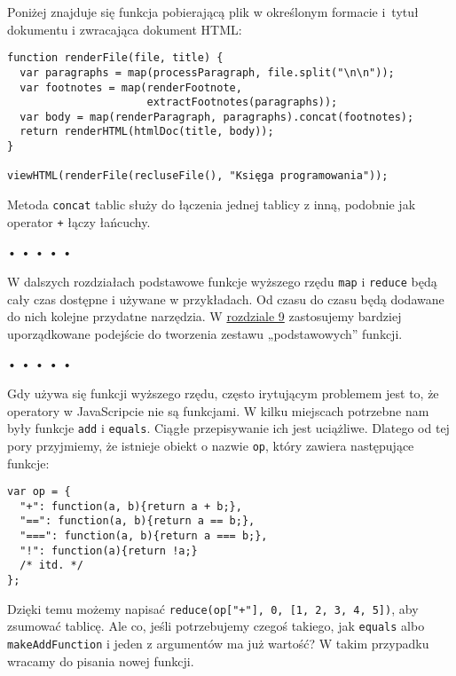Poniżej znajduje się funkcja pobierającą plik w określonym formacie i~tytuł dokumentu i zwracająca dokument HTML:

  
\begin{verbatim} 
function renderFile(file, title) {
  var paragraphs = map(processParagraph, file.split("\n\n"));
  var footnotes = map(renderFootnote,
                      extractFootnotes(paragraphs));
  var body = map(renderParagraph, paragraphs).concat(footnotes);
  return renderHTML(htmlDoc(title, body));
}

viewHTML(renderFile(recluseFile(), "Księga programowania"));
 \end{verbatim}
  
Metoda \texttt{concat} tablic służy do łączenia jednej tablicy z inną, podobnie jak operator \texttt{+} łączy łańcuchy.



\begin{center}
• • • • •
\end{center}

  
W dalszych rozdziałach podstawowe funkcje wyższego rzędu \texttt{map} i \texttt{reduce} będą cały czas dostępne i używane w przykładach. Od czasu do czasu będą dodawane do nich kolejne przydatne narzędzia. W \hyperref[chap:9]{rozdziale 9} zastosujemy bardziej uporządkowane podejście do tworzenia zestawu „podstawowych” funkcji.



\begin{center}
• • • • •
\end{center}

  
Gdy używa się funkcji wyższego rzędu, często irytującym problemem jest to, że operatory w JavaScripcie nie są funkcjami. W kilku miejscach potrzebne nam były funkcje \texttt{add} i \texttt{equals}. Ciągłe przepisywanie ich jest uciążliwe. Dlatego od tej pory przyjmiemy, że istnieje obiekt o nazwie \texttt{op}, który zawiera następujące funkcje:

  
\begin{verbatim} 
var op = {
  "+": function(a, b){return a + b;},
  "==": function(a, b){return a == b;},
  "===": function(a, b){return a === b;},
  "!": function(a){return !a;}
  /* itd. */
};
 \end{verbatim}
  
Dzięki temu możemy napisać \texttt{reduce(op["+"], 0, [1, 2, 3, 4, 5])}, aby zsumować tablicę. Ale co, jeśli potrzebujemy czegoś takiego, jak \texttt{equals} albo \texttt{makeAddFunction} i jeden z argumentów ma już wartość? W takim przypadku wracamy do pisania nowej funkcji.

